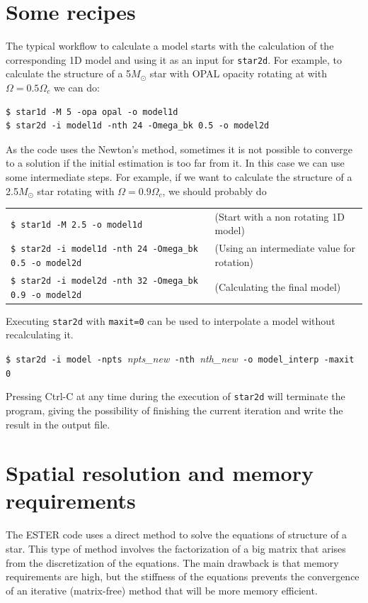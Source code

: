 \section{Some recipes}

The typical workflow to calculate a model starts with the calculation of
the corresponding 1D model and using it as an input for {\tt star2d}. For
example, to calculate the structure of a 5$M_\odot$ star with OPAL
opacity rotating at with $\Omega=0.5\Omega_c$ we can do:

\begin{verbatim}
$ star1d -M 5 -opa opal -o model1d
$ star2d -i model1d -nth 24 -Omega_bk 0.5 -o model2d
\end{verbatim}

As the code uses the Newton's method, sometimes it is not possible
to converge to a solution if the initial estimation is too far from
it. In this case we can use some intermediate steps.  For example, if
we want to calculate the structure of a 2.5$M_\odot$ star rotating with
$\Omega=0.9\Omega_c$, we should probably do

\medskip
\noindent\begin{tabular}{lp{4.5cm}}
\verb|$ star1d -M 2.5 -o model1d |  
&(Start with a non rotating 1D model)\\
\verb|$ star2d -i model1d -nth 24 -Omega_bk 0.5 -o model2d| &	
(Using an intermediate value for rotation) \\
\verb|$ star2d -i model2d -nth 32 -Omega_bk 0.9 -o model2d| &	
(Calculating the final model) 
\end{tabular}
\medskip

Executing {\tt star2d} with {\tt maxit=0} can be used to interpolate a
model without recalculating it.

\medskip
\noindent
\verb|$ star2d -i model -npts |{\it npts\_new}\verb| -nth |{\it nth\_new}\verb| -o model_interp -maxit 0|

\medskip
Pressing Ctrl-C at any time during the execution of {\tt star2d} will
terminate the program, giving the possibility of finishing the current
iteration and write the result in the output file.

\section{Spatial resolution and memory requirements}

The ESTER code uses a direct method to solve the equations of structure of a star. This type of method
involves the factorization of a big matrix that arises from the discretization of the equations.
The main drawback is that memory requirements are high, but the stiffness of the equations prevents
the convergence of an iterative (matrix-free) method that will be more memory efficient.


